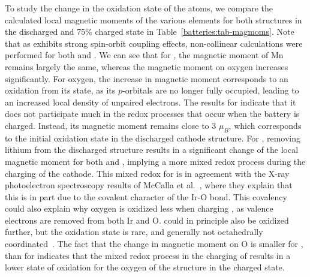 \begin{refsection}
To study the change in the oxidation state of the atoms, we compare the 
calculated local magnetic moments of the various elements for both structures 
in the discharged and 75\% charged state in Table~\ref{batteries:tab-magmoms}. 
Note that as  exhibits strong spin-orbit coupling effects, non-collinear 
calculations were performed for both  and .
We can see that for , the magnetic moment of Mn remains largely 
the same, whereas the magnetic moment on oxygen increases significantly. For 
oxygen, the increase in magnetic moment corresponds to an oxidation from its 
 state, as its $p$-orbitals are no longer fully occupied, leading 
to an increased local density of unpaired electrons. The results for  
indicate that it does not participate much in the redox processes that occur 
when the battery is charged. Instead, its magnetic moment remains close to 3 
$\mu_B$, which corresponds to the initial oxidation state  in the 
discharged cathode structure. For , removing lithium from the 
discharged structure results in a significant change of the local magnetic 
moment for both  and , implying a more mixed redox process during the 
charging of the cathode. This mixed redox for  is in agreement 
with the X-ray photoelectron spectroscopy results of McCalla et al.~\cite{McCalla2015}, where they explain 
that this is in part due to the covalent character of the Ir-O bond. This 
covalency could also explain why oxygen is oxidized less when charging 
, as valence electrons are removed from both Ir and O. 
 could in principle also be oxidized further, but the  
oxidation state is rare, and generally not octahedrally 
coordinated~\cite{Saint2007}. The fact that the change in magnetic moment on O 
is smaller for , than for  indicates that the mixed 
redox process in the charging of  results in a lower state of 
oxidation for the oxygen of the structure in the charged state.  
 

\end{refsection}
